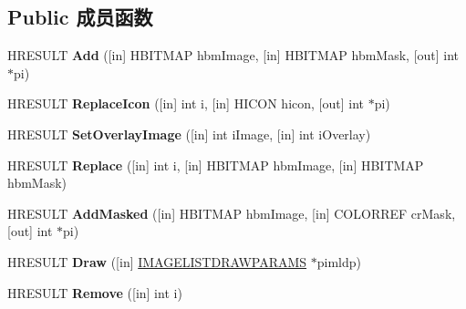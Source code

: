 \subsection*{Public 成员函数}
\begin{DoxyCompactItemize}
\item 
\mbox{\label{interface_i_image_list_a662dcf461df8731b39f22fb3efda35d0}} 
H\+R\+E\+S\+U\+LT {\bfseries Add} (\mbox{[}in\mbox{]} H\+B\+I\+T\+M\+AP hbm\+Image, \mbox{[}in\mbox{]} H\+B\+I\+T\+M\+AP hbm\+Mask, \mbox{[}out\mbox{]} int $\ast$pi)
\item 
\mbox{\label{interface_i_image_list_a000bd96f3a917c0aecbc65cb2ac66d0b}} 
H\+R\+E\+S\+U\+LT {\bfseries Replace\+Icon} (\mbox{[}in\mbox{]} int i, \mbox{[}in\mbox{]} H\+I\+C\+ON hicon, \mbox{[}out\mbox{]} int $\ast$pi)
\item 
\mbox{\label{interface_i_image_list_aed6d20bd0cc2192c66a59603860b24f9}} 
H\+R\+E\+S\+U\+LT {\bfseries Set\+Overlay\+Image} (\mbox{[}in\mbox{]} int i\+Image, \mbox{[}in\mbox{]} int i\+Overlay)
\item 
\mbox{\label{interface_i_image_list_a680805e14fcce41389382f08bf2bd11b}} 
H\+R\+E\+S\+U\+LT {\bfseries Replace} (\mbox{[}in\mbox{]} int i, \mbox{[}in\mbox{]} H\+B\+I\+T\+M\+AP hbm\+Image, \mbox{[}in\mbox{]} H\+B\+I\+T\+M\+AP hbm\+Mask)
\item 
\mbox{\label{interface_i_image_list_a9ac2d1dcde2741668af1ab9594b76c35}} 
H\+R\+E\+S\+U\+LT {\bfseries Add\+Masked} (\mbox{[}in\mbox{]} H\+B\+I\+T\+M\+AP hbm\+Image, \mbox{[}in\mbox{]} C\+O\+L\+O\+R\+R\+EF cr\+Mask, \mbox{[}out\mbox{]} int $\ast$pi)
\item 
\mbox{\label{interface_i_image_list_a634f567267cd7f10d24417049cd10306}} 
H\+R\+E\+S\+U\+LT {\bfseries Draw} (\mbox{[}in\mbox{]} \hyperlink{struct_i_m_a_g_e_l_i_s_t_d_r_a_w_p_a_r_a_m_s}{I\+M\+A\+G\+E\+L\+I\+S\+T\+D\+R\+A\+W\+P\+A\+R\+A\+MS} $\ast$pimldp)
\item 
\mbox{\label{interface_i_image_list_ae8f6d46e3aa6cacdb0750e16075d2d04}} 
H\+R\+E\+S\+U\+LT {\bfseries Remove} (\mbox{[}in\mbox{]} int i)
\item 

\end{DoxyCompactItemize}
